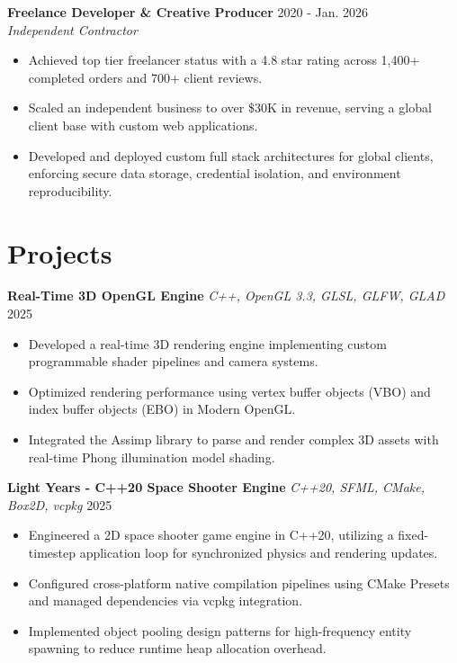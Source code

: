 \documentclass[a4paper,10pt]{article}
\begin{document}
\vspace{3pt}
\textbf{Freelance Developer \& Creative Producer} \hfill 2020 - Jan. 2026 \\
\textit{Independent Contractor}
\begin{itemize}
    \item Achieved top tier freelancer status with a 4.8 star rating across 1,400+ completed orders and 700+ client reviews.
    \item Scaled an independent business to over \$30K in revenue, serving a global client base with custom web applications.
    \item Developed and deployed custom full stack architectures for global clients, enforcing secure data storage, credential isolation, and environment reproducibility.
\end{itemize}

\section*{Projects}
\textbf{Real-Time 3D OpenGL Engine} \enspace\textbar\enspace \textit{C++, OpenGL 3.3, GLSL, GLFW, GLAD} \hfill 2025 \\
\begin{itemize}
    \item Developed a real-time 3D rendering engine implementing custom programmable shader pipelines and camera systems.
    \item Optimized rendering performance using vertex buffer objects (VBO) and index buffer objects (EBO) in Modern OpenGL.
    \item Integrated the Assimp library to parse and render complex 3D assets with real-time Phong illumination model shading.
\end{itemize}

\vspace{3pt}
\textbf{Light Years - C++20 Space Shooter Engine} \enspace\textbar\enspace \textit{C++20, SFML, CMake, Box2D, vcpkg} \hfill 2025 \\
\begin{itemize}
    \item Engineered a 2D space shooter game engine in C++20, utilizing a fixed-timestep application loop for synchronized physics and rendering updates.
    \item Configured cross-platform native compilation pipelines using CMake Presets and managed dependencies via vcpkg integration.
    \item Implemented object pooling design patterns for high-frequency entity spawning to reduce runtime heap allocation overhead.
\end{itemize}
\end{document}
